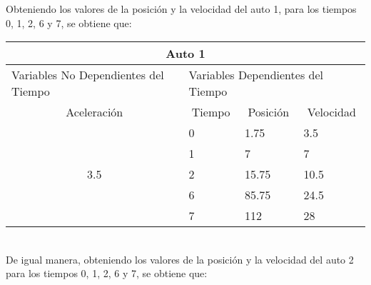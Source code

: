 \documentclass[letterpaper, 12pt]{article}
\begin{document}
\begin{itemize}
Obteniendo los valores de la posici\'on y la velocidad  del auto 1, para los tiempos 0, 1, 2, 6 y 7, se obtiene que: \\


\begin{tabular}{|cllll|}
\hline
\multicolumn{5}{|c|}{Auto 1}                                                                                                                              \\ \hline
\multicolumn{2}{|l|}{Variables No Dependientes del Tiempo} & \multicolumn{3}{l|}{Variables Dependientes del Tiempo}                                       \\ \hline
\multicolumn{2}{|c|}{Aceleración}                          & \multicolumn{1}{c|}{Tiempo} & \multicolumn{1}{c|}{Posición} & \multicolumn{1}{c|}{Velocidad} \\ \hline
\multicolumn{2}{|c|}{\multirow{5}{*}{3.5}}                 & \multicolumn{1}{l|}{0}      & \multicolumn{1}{l|}{1.75}     & 3.5                            \\ \cline{3-5} 
\multicolumn{2}{|c|}{}                                     & \multicolumn{1}{l|}{1}      & \multicolumn{1}{l|}{7}        & 7                              \\ \cline{3-5} 
\multicolumn{2}{|c|}{}                                     & \multicolumn{1}{l|}{2}      & \multicolumn{1}{l|}{15.75}    & 10.5                           \\ \cline{3-5} 
\multicolumn{2}{|c|}{}                                     & \multicolumn{1}{l|}{6}      & \multicolumn{1}{l|}{85.75}    & 24.5                           \\ \cline{3-5} 
\multicolumn{2}{|c|}{}                                     & \multicolumn{1}{l|}{7}      & \multicolumn{1}{l|}{112}      & 28                             \\ \hline
\end{tabular} \\

De igual manera, obteniendo los valores de la posici\'on y la velocidad  del auto 2 para los tiempos 0, 1, 2, 6 y 7, se obtiene que: \\


\end{itemize}
\end{document}
